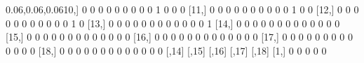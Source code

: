 \documentclass[12pt, krantz2,]{krantz}
\newenvironment{Shaded}{\begin{snugshade}}{\end{snugshade}}
\newcommand{\DecValTok}[1]{\textcolor[rgb]{0.06,0.06,0.06}{#1}}
\newcommand{\NormalTok}[1]{#1}
\theoremstyle{definition}
\theoremstyle{definition}
\theoremstyle{definition}
\newcommand{\1}{\mathbbm{1}}
\begin{document}
\begin{Shaded}
\begin{Highlighting}[]
\NormalTok{[}\DecValTok{10}\NormalTok{,]    }\DecValTok{0}    \DecValTok{0}    \DecValTok{0}    \DecValTok{0}    \DecValTok{0}    \DecValTok{0}    \DecValTok{0}    \DecValTok{0}    \DecValTok{0}     \DecValTok{1}     \DecValTok{0}     \DecValTok{0}     \DecValTok{0}
\NormalTok{[}\DecValTok{11}\NormalTok{,]    }\DecValTok{0}    \DecValTok{0}    \DecValTok{0}    \DecValTok{0}    \DecValTok{0}    \DecValTok{0}    \DecValTok{0}    \DecValTok{0}    \DecValTok{0}     \DecValTok{0}     \DecValTok{1}     \DecValTok{0}     \DecValTok{0}
\NormalTok{[}\DecValTok{12}\NormalTok{,]    }\DecValTok{0}    \DecValTok{0}    \DecValTok{0}    \DecValTok{0}    \DecValTok{0}    \DecValTok{0}    \DecValTok{0}    \DecValTok{0}    \DecValTok{0}     \DecValTok{0}     \DecValTok{0}     \DecValTok{1}     \DecValTok{0}
\NormalTok{[}\DecValTok{13}\NormalTok{,]    }\DecValTok{0}    \DecValTok{0}    \DecValTok{0}    \DecValTok{0}    \DecValTok{0}    \DecValTok{0}    \DecValTok{0}    \DecValTok{0}    \DecValTok{0}     \DecValTok{0}     \DecValTok{0}     \DecValTok{0}     \DecValTok{1}
\NormalTok{[}\DecValTok{14}\NormalTok{,]    }\DecValTok{0}    \DecValTok{0}    \DecValTok{0}    \DecValTok{0}    \DecValTok{0}    \DecValTok{0}    \DecValTok{0}    \DecValTok{0}    \DecValTok{0}     \DecValTok{0}     \DecValTok{0}     \DecValTok{0}     \DecValTok{0}
\NormalTok{[}\DecValTok{15}\NormalTok{,]    }\DecValTok{0}    \DecValTok{0}    \DecValTok{0}    \DecValTok{0}    \DecValTok{0}    \DecValTok{0}    \DecValTok{0}    \DecValTok{0}    \DecValTok{0}     \DecValTok{0}     \DecValTok{0}     \DecValTok{0}     \DecValTok{0}
\NormalTok{[}\DecValTok{16}\NormalTok{,]    }\DecValTok{0}    \DecValTok{0}    \DecValTok{0}    \DecValTok{0}    \DecValTok{0}    \DecValTok{0}    \DecValTok{0}    \DecValTok{0}    \DecValTok{0}     \DecValTok{0}     \DecValTok{0}     \DecValTok{0}     \DecValTok{0}
\NormalTok{[}\DecValTok{17}\NormalTok{,]    }\DecValTok{0}    \DecValTok{0}    \DecValTok{0}    \DecValTok{0}    \DecValTok{0}    \DecValTok{0}    \DecValTok{0}    \DecValTok{0}    \DecValTok{0}     \DecValTok{0}     \DecValTok{0}     \DecValTok{0}     \DecValTok{0}
\NormalTok{[}\DecValTok{18}\NormalTok{,]    }\DecValTok{0}    \DecValTok{0}    \DecValTok{0}    \DecValTok{0}    \DecValTok{0}    \DecValTok{0}    \DecValTok{0}    \DecValTok{0}    \DecValTok{0}     \DecValTok{0}     \DecValTok{0}     \DecValTok{0}     \DecValTok{0}
\NormalTok{      [,}\DecValTok{14}\NormalTok{] [,}\DecValTok{15}\NormalTok{] [,}\DecValTok{16}\NormalTok{] [,}\DecValTok{17}\NormalTok{] [,}\DecValTok{18}\NormalTok{]}
\NormalTok{ [}\DecValTok{1}\NormalTok{,]     }\DecValTok{0}     \DecValTok{0}     \DecValTok{0}     \DecValTok{0}     \DecValTok{0}

\end{Highlighting}
\end{Shaded}
\end{document}
